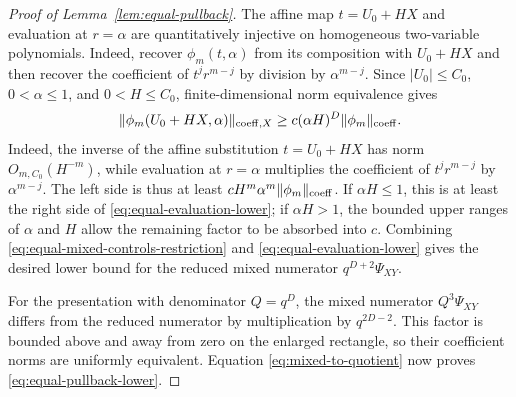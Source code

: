\documentclass[11pt]{article}
\numberwithin{equation}{section}
\theoremstyle{remark}
\theoremstyle{definition}
\newcommand{\norm}[1]{\lVert #1\rVert}
\begin{document}
\begin{proof}[Proof of Lemma~\ref{lem:equal-pullback}]
The affine map $t=U_0+HX$ and evaluation at $r=\alpha$ are quantitatively
injective on homogeneous two-variable polynomials.  Indeed, recover
$\phi_m(t,\alpha)$ from its composition with $U_0+HX$ and then recover
the coefficient of $t^jr^{m-j}$ by division by $\alpha^{m-j}$.  Since
$|U_0|\le C_0$, $0<\alpha\le1$, and $0<H\le C_0$, finite-dimensional
norm equivalence gives
\begin{equation}\label{eq:equal-evaluation-lower}
 \norm{\phi_m(U_0+HX,\alpha)}_{\mathrm{coeff},X}
 \ge c(\alpha H)^D\norm{\phi_m}_{\rm coeff}.
\end{equation}
Indeed, the inverse of the affine substitution $t=U_0+HX$ has norm
$O_{m,C_0}(H^{-m})$, while evaluation at $r=\alpha$ multiplies the
coefficient of $t^jr^{m-j}$ by $\alpha^{m-j}$.  The left side is thus
at least $cH^m\alpha^m\norm{\phi_m}_{\rm coeff}$.  If
$\alpha H\le1$, this is at least the right side of
\eqref{eq:equal-evaluation-lower}; if $\alpha H>1$, the bounded upper
ranges of $\alpha$ and $H$ allow the remaining factor to be absorbed
into $c$.
Combining \eqref{eq:equal-mixed-controls-restriction} and
\eqref{eq:equal-evaluation-lower} gives the desired lower bound for the
reduced mixed numerator $q^{D+2}\Psi_{XY}$.

For the presentation with denominator $Q=q^D$, the mixed numerator
$Q^3\Psi_{XY}$ differs from the reduced numerator by multiplication by
$q^{2D-2}$.  This factor is bounded above and away from zero on the
enlarged rectangle, so their coefficient norms are uniformly equivalent.
Equation \eqref{eq:mixed-to-quotient} now proves
\eqref{eq:equal-pullback-lower}.
\end{proof}
\end{document}
